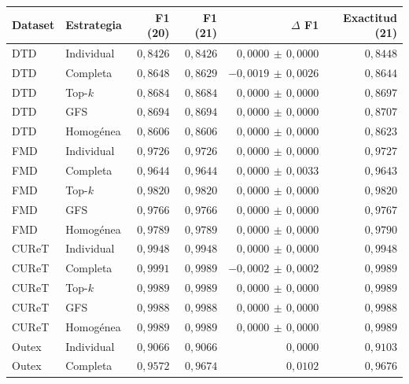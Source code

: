 \begin{resulttable}
\centering\fontsize{9}{11}\selectfont\setlength{\tabcolsep}{3.6pt}
\caption{Comparación completa con SVM: medias con 20 frente a 21 bloques, incluyendo RGB Pixel N-grams + SVD. Mismas 28 condiciones externas: DTD (10), FMD (15), CUReT (2) y Outex (1). La selección se repite dentro del entrenamiento.}
\label{tab:ngram-svm}
\begin{tabular}{@{}llrrrr@{}}
\toprule
Dataset & Estrategia & F1 (20) & F1 (21) & $\Delta$ F1 & Exactitud (21) \\
\midrule
DTD & Individual & $0{,}8426$ & $0{,}8426$ & $0{,}0000\,\pm\,0{,}0000$ & $0{,}8448$ \\
DTD & Completa & $0{,}8648$ & $0{,}8629$ & $-0{,}0019\,\pm\,0{,}0026$ & $0{,}8644$ \\
DTD & Top-$k$ & $0{,}8684$ & $0{,}8684$ & $0{,}0000\,\pm\,0{,}0000$ & $0{,}8697$ \\
DTD & GFS & $0{,}8694$ & $0{,}8694$ & $0{,}0000\,\pm\,0{,}0000$ & $0{,}8707$ \\
DTD & Homogénea & $0{,}8606$ & $0{,}8606$ & $0{,}0000\,\pm\,0{,}0000$ & $0{,}8623$ \\
FMD & Individual & $0{,}9726$ & $0{,}9726$ & $0{,}0000\,\pm\,0{,}0000$ & $0{,}9727$ \\
FMD & Completa & $0{,}9644$ & $0{,}9644$ & $0{,}0000\,\pm\,0{,}0033$ & $0{,}9643$ \\
FMD & Top-$k$ & $0{,}9820$ & $0{,}9820$ & $0{,}0000\,\pm\,0{,}0000$ & $0{,}9820$ \\
FMD & GFS & $0{,}9766$ & $0{,}9766$ & $0{,}0000\,\pm\,0{,}0000$ & $0{,}9767$ \\
FMD & Homogénea & $0{,}9789$ & $0{,}9789$ & $0{,}0000\,\pm\,0{,}0000$ & $0{,}9790$ \\
CUReT & Individual & $0{,}9948$ & $0{,}9948$ & $0{,}0000\,\pm\,0{,}0000$ & $0{,}9948$ \\
CUReT & Completa & $0{,}9991$ & $0{,}9989$ & $-0{,}0002\,\pm\,0{,}0002$ & $0{,}9989$ \\
CUReT & Top-$k$ & $0{,}9989$ & $0{,}9989$ & $0{,}0000\,\pm\,0{,}0000$ & $0{,}9989$ \\
CUReT & GFS & $0{,}9988$ & $0{,}9988$ & $0{,}0000\,\pm\,0{,}0000$ & $0{,}9988$ \\
CUReT & Homogénea & $0{,}9989$ & $0{,}9989$ & $0{,}0000\,\pm\,0{,}0000$ & $0{,}9989$ \\
Outex & Individual & $0{,}9066$ & $0{,}9066$ & $0{,}0000$ & $0{,}9103$ \\
Outex & Completa & $0{,}9572$ & $0{,}9674$ & $0{,}0102$ & $0{,}9676$ \\

\end{tabular}
\end{resulttable}
